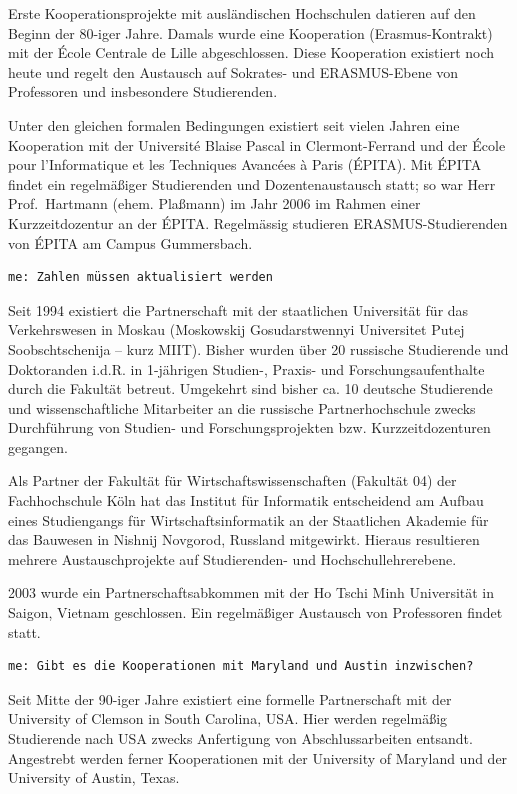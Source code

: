 Erste Kooperationsprojekte mit ausländischen Hochschulen datieren auf
den Beginn der 80-iger Jahre. Damals wurde eine Kooperation
(Erasmus-Kontrakt) mit der École Centrale de Lille abgeschlossen. Diese
Kooperation existiert noch heute und regelt den Austausch auf Sokrates-
und ERASMUS-Ebene von Professoren und insbesondere Studierenden.

Unter den gleichen formalen Bedingungen existiert seit vielen Jahren
eine Kooperation mit der Université Blaise Pascal in Clermont-Ferrand
und der École pour l'Informatique et les Techniques Avancées à Paris
(ÉPITA). Mit ÉPITA findet ein regelmäßiger Studierenden und
Dozentenaustausch statt; so war Herr Prof.~Hartmann (ehem. Plaßmann) im
Jahr 2006 im Rahmen einer Kurzzeitdozentur an der ÉPITA. Regelmässig
studieren ERASMUS-Studierenden von ÉPITA am Campus Gummersbach.

\begin{verbatim}
me: Zahlen müssen aktualisiert werden
\end{verbatim}

Seit 1994 existiert die Partnerschaft mit der staatlichen Universität
für das Verkehrswesen in Moskau (Moskowskij Gosudarstwennyi Universitet
Putej Soobschtschenija -- kurz MIIT). Bisher wurden über 20 russische
Studierende und Doktoranden i.d.R. in 1-jährigen Studien-, Praxis- und
Forschungsaufenthalte durch die Fakultät betreut. Umgekehrt sind bisher
ca. 10 deutsche Studierende und wissenschaftliche Mitarbeiter an die
russische Partnerhochschule zwecks Durchführung von Studien- und
Forschungsprojekten bzw. Kurzzeitdozenturen gegangen.

Als Partner der Fakultät für Wirtschaftswissenschaften (Fakultät 04) der
Fachhochschule Köln hat das Institut für Informatik entscheidend am
Aufbau eines Studiengangs für Wirtschaftsinformatik an der Staatlichen
Akademie für das Bauwesen in Nishnij Novgorod, Russland mitgewirkt.
Hieraus resultieren mehrere Austauschprojekte auf Studierenden- und
Hochschullehrerebene.

2003 wurde ein Partnerschaftsabkommen mit der Ho Tschi Minh Universität
in Saigon, Vietnam geschlossen. Ein regelmäßiger Austausch von
Professoren findet statt.

\begin{verbatim}
me: Gibt es die Kooperationen mit Maryland und Austin inzwischen?
\end{verbatim}

Seit Mitte der 90-iger Jahre existiert eine formelle Partnerschaft mit
der University of Clemson in South Carolina, USA. Hier werden regelmäßig
Studierende nach USA zwecks Anfertigung von Abschlussarbeiten entsandt.
Angestrebt werden ferner Kooperationen mit der University of Maryland
und der University of Austin, Texas.

